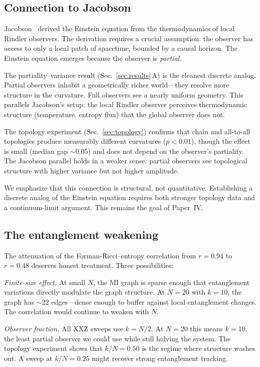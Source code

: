 \documentclass[aps,pra,twocolumn,superscriptaddress,floatfix]{revtex4-2}
\begin{document}
\subsection{Connection to Jacobson}

Jacobson~\cite{jacobson1995} derived the Einstein equation from the thermodynamics of local Rindler observers.  The derivation requires a crucial assumption: the observer has access to only a local patch of spacetime, bounded by a causal horizon.  The Einstein equation emerges because the observer is \textit{partial}.

The partiality--variance result (Sec.~\ref{sec:results}\,A) is the cleanest discrete analog.  Partial observers inhabit a geometrically richer world---they resolve more structure in the curvature.  Full observers see a nearly uniform geometry.  This parallels Jacobson's setup: the local Rindler observer perceives thermodynamic structure (temperature, entropy flux) that the global observer does not.

The topology experiment (Sec.~\ref{sec:topology}) confirms that chain and all-to-all topologies produce measurably different curvatures ($p < 0.01$), though the effect is small (median gap $\sim$0.05) and does not depend on the observer's partiality.  The Jacobson parallel holds in a weaker sense: partial observers see topological structure with higher variance but not higher amplitude.

We emphasize that this connection is structural, not quantitative.  Establishing a discrete analog of the Einstein equation requires both stronger topology data and a continuum-limit argument.  This remains the goal of Paper~IV.


\subsection{The entanglement weakening}

The attenuation of the Forman-Ricci--entropy correlation from $r = 0.94$ to $r = 0.48$ deserves honest treatment.  Three possibilities:

\textit{Finite-size effect.}  At small $N$, the MI graph is sparse enough that entanglement variations directly modulate the graph structure.  At $N = 20$ with $k = 10$, the graph has $\sim$22 edges---dense enough to buffer against local entanglement changes.  The correlation would continue to weaken with $N$.

\textit{Observer fraction.}  All XXZ sweeps use $k = N/2$.  At $N = 20$ this means $k = 10$, the least partial observer we could use while still halving the system.  The topology experiment shows that $k/N = 0.50$ is the regime where structure washes out.  A sweep at $k/N = 0.25$ might recover strong entanglement tracking.
\end{document}
